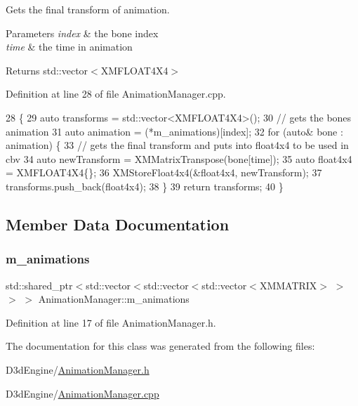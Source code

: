 Gets the final transform of animation. 


\begin{DoxyParams}{Parameters}
{\em index} & the bone index \\
\hline
{\em time} & the time in animation \\
\hline
\end{DoxyParams}
\begin{DoxyReturn}{Returns}
std\+::vector$<$\+X\+M\+F\+L\+O\+A\+T4\+X4$>$ 
\end{DoxyReturn}


Definition at line 28 of file Animation\+Manager.\+cpp.


\begin{DoxyCode}
28                                                                                    \{
29     \textcolor{keyword}{auto} transforms = std::vector<XMFLOAT4X4>();
30     \textcolor{comment}{// gets the bones animation}
31     \textcolor{keyword}{auto} animation = (*m\_animations)[index];
32     \textcolor{keywordflow}{for} (\textcolor{keyword}{auto}& bone : animation) \{
33         \textcolor{comment}{// gets the final transform and puts into float4x4 to be used in cbv}
34         \textcolor{keyword}{auto} newTransform = XMMatrixTranspose(bone[time]);
35         \textcolor{keyword}{auto} float4x4 = XMFLOAT4X4\{\};
36         XMStoreFloat4x4(&float4x4, newTransform);
37         transforms.push\_back(float4x4);
38     \}
39     \textcolor{keywordflow}{return} transforms;
40 \}
\end{DoxyCode}


\subsection{Member Data Documentation}
\mbox{\label{class_animation_manager_a30d55ef88d1fcea24ba39a254a84b56a}} 
\subsubsection{\texorpdfstring{m\+\_\+animations}{m\_animations}}
{\footnotesize\ttfamily std\+::shared\+\_\+ptr$<$std\+::vector$<$std\+::vector$<$std\+::vector$<$X\+M\+M\+A\+T\+R\+IX$>$ $>$ $>$ $>$ Animation\+Manager\+::m\+\_\+animations\hspace{0.3cm}{\ttfamily [private]}}



Definition at line 17 of file Animation\+Manager.\+h.



The documentation for this class was generated from the following files\+:\begin{DoxyCompactItemize}
\item 
D3d\+Engine/\mbox{\hyperlink{_animation_manager_8h}{Animation\+Manager.\+h}}\item 
D3d\+Engine/\mbox{\hyperlink{_animation_manager_8cpp}{Animation\+Manager.\+cpp}}\end{DoxyCompactItemize}
